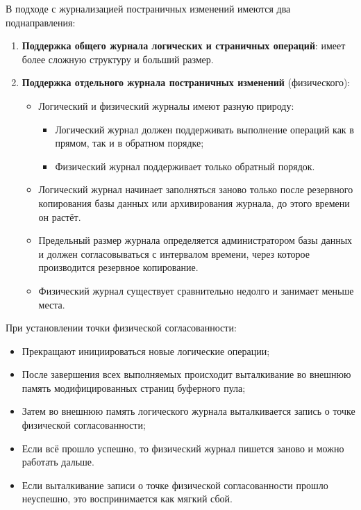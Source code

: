 \documentclass[a4paper,12pt]{article}
\begin{document}
В подходе с журнализацией постраничных изменений имеются два поднаправления:
\begin{enumerate}
    \item \textbf{Поддержка общего журнала логических и страничных операций}: имеет более сложную структуру и больший размер.
    \item \textbf{Поддержка отдельного журнала постраничных изменений} (физического):
    \begin{itemize}
        \item Логический и физический журналы имеют разную природу:
        \begin{itemize}
            \item Логический журнал должен поддерживать выполнение операций как в прямом, так и в обратном порядке;
            \item Физический журнал поддерживает только обратный порядок.
        \end{itemize}
        \item Логический журнал начинает заполняться заново только после резервного копирования базы данных или архивирования журнала, до этого времени он растёт.
        \item Предельный размер журнала определяется администратором базы данных и должен согласовываться с интервалом времени, через которое производится резервное копирование.
        \item Физический журнал существует сравнительно недолго и занимает меньше места.
    \end{itemize}
\end{enumerate}

При установлении точки физической согласованности:
\begin{itemize}
    \item Прекращают инициироваться новые логические операции;
    \item После завершения всех выполняемых происходит выталкивание во внешнюю память модифицированных страниц буферного пула;
    \item Затем во внешнюю память логического журнала выталкивается запись о точке физической согласованности;
    \item Если всё прошло успешно, то физический журнал пишется заново и можно работать дальше.
    \item Если выталкивание записи о точке физической согласованности прошло неуспешно, это воспринимается как мягкий сбой.
\end{itemize}
\end{document}
